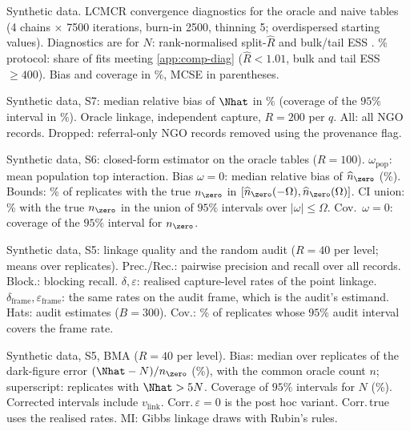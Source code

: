 \begin{table}[tp]
\centering
\caption{Synthetic data. LCMCR convergence diagnostics for the oracle and naive tables (4 chains $\times$ 7500 iterations, burn-in 2500, thinning 5; overdispersed starting values). Diagnostics are for $N$: rank-normalised split-$\widehat R$ and bulk/tail ESS \citep{vehtari2021}. \% protocol: share of fits meeting \cref{app:comp-diag} ($\widehat R<1.01$, bulk and tail ESS $\ge400$). Bias and coverage in $\%$, MCSE in parentheses.}\label{tab:sim-lcmcr}
\setlength{\tabcolsep}{3pt}
\simfit{}
\end{table}

\begin{table}[tp]
\centering
\caption{Synthetic data, S7: median relative bias of $\Nhat$ in $\%$ (coverage of the $95\%$ interval in $\%$). Oracle linkage, independent capture, $R=200$ per $q$. All: all NGO records. Dropped: referral-only NGO records removed using the provenance flag.}\label{tab:sim-referral}
\small

\end{table}

\begin{table}[tp]
\centering
\caption{Synthetic data, S6: closed-form estimator on the oracle tables ($R=100$). $\omega_{\mathrm{pop}}$: mean population top interaction. Bias $\omega{=}0$: median relative bias of $\widehat n_{\zero}$ (\%). Bounds: \% of replicates with the true $n_{\zero}$ in $[\widehat n_{\zero}(-\Omega),\widehat n_{\zero}(\Omega)]$. CI union: \% with the true $n_{\zero}$ in the union of $95\%$ intervals over $|\omega|\le\Omega$. Cov.\ $\omega{=}0$: coverage of the $95\%$ interval for $n_{\zero}$.}\label{tab:sim-sensitivity}
\small

\end{table}

\begin{table}[tp]
\centering
\caption{Synthetic data, S5: linkage quality and the random audit ($R=40$ per level; means over replicates). Prec./Rec.: pairwise precision and recall over all records. Block.: blocking recall. $\delta,\varepsilon$: realised capture-level rates of the point linkage. $\delta_{\mathrm{frame}},\varepsilon_{\mathrm{frame}}$: the same rates on the audit frame, which is the audit's estimand. Hats: audit estimates ($B=300$). Cov.: \% of replicates whose $95\%$ audit interval covers the frame rate.}\label{tab:sim-linkage}
\small

\end{table}

\begin{table}[tp]
\centering
\caption{Synthetic data, S5, BMA ($R=40$ per level). Bias: median over replicates of the dark-figure error $(\Nhat-N)/n_{\zero}$ (\%), with the common oracle count $n$; superscript: replicates with $\Nhat>5N$. Coverage of $95\%$ intervals for $N$ (\%). Corrected intervals include $v_{\mathrm{link}}$. Corr.\,$\varepsilon{=}0$ is the post hoc variant. Corr.\,true uses the realised rates. MI: Gibbs linkage draws with Rubin's rules.}\label{tab:sim-linkage-bias}
\small
\setlength{\tabcolsep}{4pt}
\simfit{}
\end{table}
